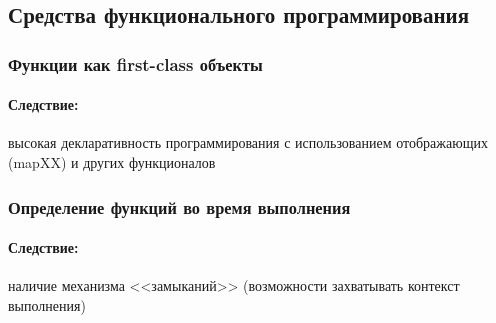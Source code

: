 \subsection{Средства функционального программирования}
\subsubsection{Функции как first-class объекты}
\paragraph{Следствие:} высокая декларативность программирования с использованием отображающих (mapXX) и других функционалов
\subsubsection{Определение функций во время выполнения}
\paragraph{Следствие:} наличие механизма <<замыканий>> (возможности захватывать контекст выполнения)
